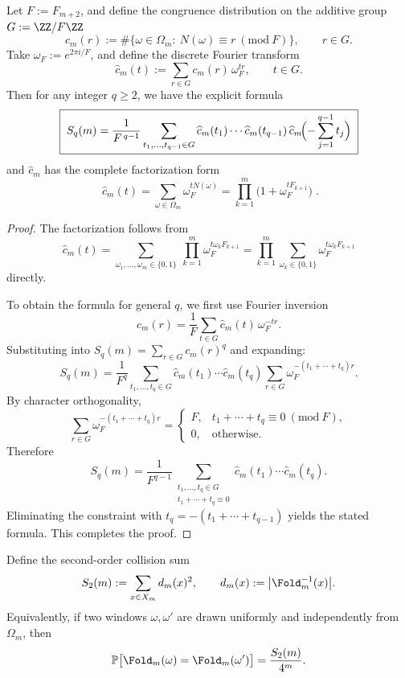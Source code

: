\begin{proposition}\label{prop:pom-moment-fourier-q}
Let $F:=F_{m+2}$, and define the congruence distribution on the additive group $G:=\ZZ/F\ZZ$
$$
c_m(r):=\#\{\omega\in\Omega_m:\ N(\omega)\equiv r\ (\mathrm{mod}\ F)\},\qquad r\in G.
$$
Take $\omega_F:=e^{2\pi i/F}$, and define the discrete Fourier transform
$$
\widehat c_m(t):=\sum_{r\in G} c_m(r)\,\omega_F^{tr},\qquad t\in G.
$$
Then for any integer $q\ge 2$, we have the explicit formula
$$
\boxed{\;
S_q(m)=\frac{1}{F^{\,q-1}}
\sum_{t_1,\dots,t_{q-1}\in G}
\widehat c_m(t_1)\cdots \widehat c_m(t_{q-1})\,
\widehat c_m\!\Bigl(-\sum_{j=1}^{q-1}t_j\Bigr)\;}
$$
and $\widehat c_m$ has the complete factorization form
$$
\boxed{\;
\widehat c_m(t)=\sum_{\omega\in\Omega_m}\omega_F^{tN(\omega)}
=\prod_{k=1}^m\bigl(1+\omega_F^{tF_{k+1}}\bigr)\; }.
$$
\end{proposition}
\begin{proof}
The factorization follows from
$$
\widehat c_m(t)=\sum_{\omega_1,\dots,\omega_m\in\{0,1\}}\ \prod_{k=1}^m \omega_F^{t\omega_kF_{k+1}}
=\prod_{k=1}^m\sum_{\omega_k\in\{0,1\}} \omega_F^{t\omega_kF_{k+1}}
$$
directly.

To obtain the formula for general $q$, we first use Fourier inversion
$$
c_m(r)=\frac{1}{F}\sum_{t\in G}\widehat c_m(t)\,\omega_F^{-tr}.
$$
Substituting into $S_q(m)=\sum_{r\in G}c_m(r)^q$ and expanding:
$$
S_q(m)
=\frac{1}{F^q}\sum_{t_1,\dots,t_q\in G}\widehat c_m(t_1)\cdots\widehat c_m(t_q)\sum_{r\in G}\omega_F^{-(t_1+\cdots+t_q)r}.
$$
By character orthogonality,
$$
\sum_{r\in G}\omega_F^{-(t_1+\cdots+t_q)r}
=
\begin{cases}
F,& t_1+\cdots+t_q\equiv 0\ (\mathrm{mod}\ F),\\
0,& \text{otherwise}.
\end{cases}
$$
Therefore
$$
S_q(m)=\frac{1}{F^{q-1}}\sum_{\substack{t_1,\dots,t_q\in G\\ t_1+\cdots+t_q\equiv 0}}
\widehat c_m(t_1)\cdots\widehat c_m(t_q).
$$
Eliminating the constraint with $t_q=-(t_1+\cdots+t_{q-1})$ yields the stated formula. This completes the proof.
\end{proof}

\begin{definition}\label{def:pom-s2}
Define the second-order collision sum
$$
S_2(m):=\sum_{x\in X_m} d_m(x)^2,
\qquad d_m(x):=\bigl|\Fold_m^{-1}(x)\bigr|.
$$
Equivalently, if two windows \(\omega,\omega'\) are drawn uniformly and independently from \(\Omega_m\), then
$$
\mathbb{P}\bigl[\Fold_m(\omega)=\Fold_m(\omega')\bigr]=\frac{S_2(m)}{4^m}.
$$
\end{definition}

